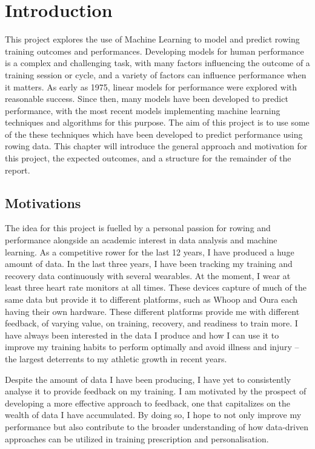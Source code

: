 \chapter{\label{ch:intro}Introduction}
This project explores the use of Machine Learning to model and predict rowing training outcomes and performances. Developing models for human performance is a complex and challenging task, with many factors influencing the outcome of a training session or cycle, and a variety of factors can influence performance when it matters. As early as 1975, linear models for performance were explored with reasonable success. Since then, many models have been developed to predict performance, with the most recent models implementing machine learning techniques and algorithms for this purpose. The aim of this project is to use some of the these techniques which have been developed to predict performance using rowing data. This chapter will introduce the general approach and motivation for this project, the expected outcomes, and a structure for the remainder of the report.

\section{Motivations}
The idea for this project is fuelled by a personal passion for rowing and performance alongside an academic interest in data analysis and machine learning. As a competitive rower for the last 12 years, I have produced a huge amount of data. In the last three years, I have been tracking my training and recovery data continuously with several wearables. At the moment, I wear at least three heart rate monitors at all times. These devices capture of much of the same data but provide it to different platforms, such as Whoop and Oura each having their own hardware. These different platforms provide me with different feedback, of varying value, on training, recovery, and readiness to train more. I have always been interested in the data I produce and how I can use it to improve my training habits to perform optimally and avoid illness and injury -- the largest deterrents to my athletic growth in recent years. 

Despite the amount of data I have been producing, I have yet to consistently analyse it to provide feedback on my training. I am motivated by the prospect of developing a more effective approach to feedback, one that capitalizes on the wealth of data I have accumulated. By doing so, I hope to not only improve my performance but also contribute to the broader understanding of how data-driven approaches can be utilized in training prescription and personalisation.

